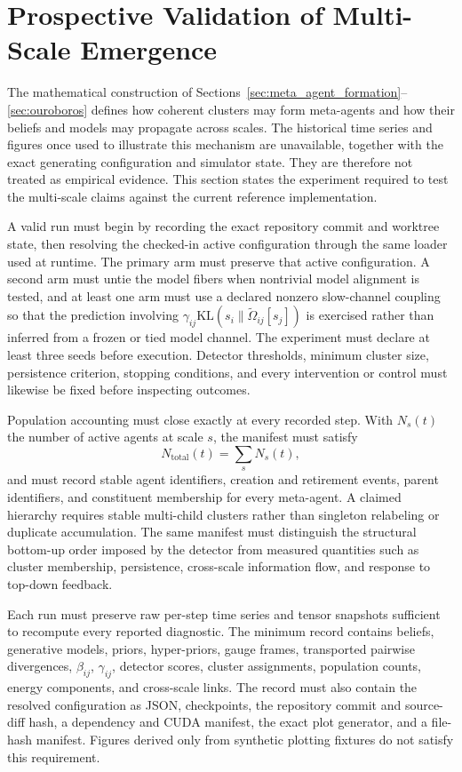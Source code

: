 \documentclass[11pt]{article}
\begin{document}
\section{Prospective Validation of Multi-Scale Emergence}\label{sec:participatory}

The mathematical construction of Sections~\ref{sec:meta_agent_formation}--\ref{sec:ouroboros} defines how coherent clusters may form meta-agents and how their beliefs and models may propagate across scales. The historical time series and figures once used to illustrate this mechanism are unavailable, together with the exact generating configuration and simulator state. They are therefore not treated as empirical evidence. This section states the experiment required to test the multi-scale claims against the current reference implementation.

A valid run must begin by recording the exact repository commit and worktree state, then resolving the checked-in active configuration through the same loader used at runtime. The primary arm must preserve that active configuration. A second arm must untie the model fibers when nontrivial model alignment is tested, and at least one arm must use a declared nonzero slow-channel coupling so that the prediction involving $\gamma_{ij}\mathrm{KL}(s_i\|\tilde\Omega_{ij}[s_j])$ is exercised rather than inferred from a frozen or tied model channel. The experiment must declare at least three seeds before execution. Detector thresholds, minimum cluster size, persistence criterion, stopping conditions, and every intervention or control must likewise be fixed before inspecting outcomes.

Population accounting must close exactly at every recorded step. With $N_s(t)$ the number of active agents at scale $s$, the manifest must satisfy
\begin{equation}
N_{\mathrm{total}}(t)=\sum_s N_s(t),
\end{equation}
and must record stable agent identifiers, creation and retirement events, parent identifiers, and constituent membership for every meta-agent. A claimed hierarchy requires stable multi-child clusters rather than singleton relabeling or duplicate accumulation. The same manifest must distinguish the structural bottom-up order imposed by the detector from measured quantities such as cluster membership, persistence, cross-scale information flow, and response to top-down feedback.

Each run must preserve raw per-step time series and tensor snapshots sufficient to recompute every reported diagnostic. The minimum record contains beliefs, generative models, priors, hyper-priors, gauge frames, transported pairwise divergences, $\beta_{ij}$, $\gamma_{ij}$, detector scores, cluster assignments, population counts, energy components, and cross-scale links. The record must also contain the resolved configuration as JSON, checkpoints, the repository commit and source-diff hash, a dependency and CUDA manifest, the exact plot generator, and a file-hash manifest. Figures derived only from synthetic plotting fixtures do not satisfy this requirement.
\end{document}

